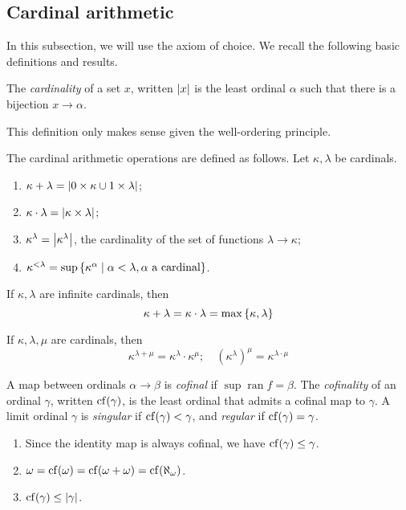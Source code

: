 \subsection{Cardinal arithmetic}
In this subsection, we will use the axiom of choice.
We recall the following basic definitions and results.
\begin{definition}
    The \emph{cardinality} of a set \( x \), written \( \abs{x} \) is the least ordinal \( \alpha \) such that there is a bijection \( x \to \alpha \).
\end{definition}
This definition only makes sense given the well-ordering principle.
\begin{definition}
    The cardinal arithmetic operations are defined as follows.
    Let \( \kappa, \lambda \) be cardinals.
    \begin{enumerate}
        \item \( \kappa + \lambda = \abs{0 \times \kappa \cup 1 \times \lambda} \);
        \item \( \kappa \cdot \lambda = \abs{\kappa \times \lambda} \);
        \item \( \kappa^\lambda = \abs{\kappa^\lambda} \), the cardinality of the set of functions \( \lambda \to \kappa \);
        \item \( \kappa^{<\lambda} = \sup\qty{\kappa^\alpha \mid \alpha < \lambda, \alpha \text{ a cardinal}} \).
    \end{enumerate}
\end{definition}
\begin{theorem}[Hessenberg]
    If \( \kappa, \lambda \) are infinite cardinals, then
    \[ \kappa + \lambda = \kappa \cdot \lambda = \max\qty{\kappa, \lambda} \]
\end{theorem}
\begin{lemma}
    If \( \kappa, \lambda, \mu \) are cardinals, then
    \[ \kappa^{\lambda + \mu} = \kappa^\lambda \cdot \kappa^\mu;\quad (\kappa^\lambda)^\mu = \kappa^{\lambda \cdot \mu} \]
\end{lemma}
\begin{definition}
    A map between ordinals \( \alpha \to \beta \) is \emph{cofinal} if \( \sup \operatorname{ran} f = \beta \).
    The \emph{cofinality} of an ordinal \( \gamma \), written \( \operatorname{cf}(\gamma) \), is the least ordinal that admits a cofinal map to \( \gamma \).
    A limit ordinal \( \gamma \) is \emph{singular} if \( \operatorname{cf}(\gamma) < \gamma \), and \emph{regular} if \( \operatorname{cf}(\gamma) = \gamma \).
\end{definition}
\begin{remark}
    \begin{enumerate}
        \item Since the identity map is always cofinal, we have \( \operatorname{cf}(\gamma) \leq \gamma \).
        \item \( \omega = \operatorname{cf}(\omega) = \operatorname{cf}(\omega + \omega) = \operatorname{cf}(\aleph_\omega) \).
        \item \( \operatorname{cf}(\gamma) \leq \abs{\gamma} \).
    \end{enumerate}
\end{remark}
